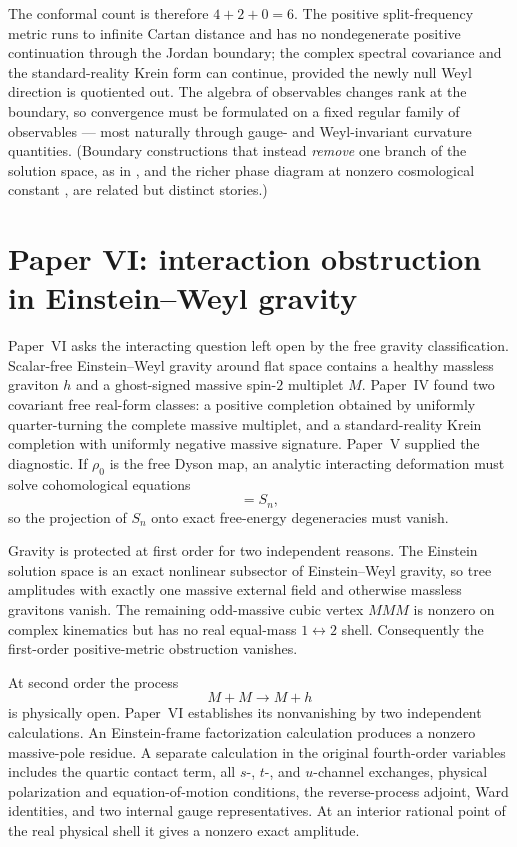 \documentclass[11pt]{article}
\theoremstyle{remark}
\begin{document}
The conformal count is therefore $4+2+0=6$.  The positive
split-frequency metric runs to infinite Cartan distance and has no
nondegenerate positive continuation through the Jordan boundary; the
complex spectral covariance and the standard-reality Krein form can
continue, provided the newly null Weyl direction is quotiented out.  The
algebra of observables changes rank at the boundary, so convergence must
be formulated on a fixed regular family of observables --- most naturally
through gauge- and Weyl-invariant curvature quantities.  (Boundary
constructions that instead \emph{remove} one branch of the solution
space, as in \cite{Maldacena}, and the richer phase diagram at nonzero
cosmological constant \cite{LuPope,DeserWaldron}, are related but
distinct stories.)

\section{Paper VI: interaction obstruction in Einstein--Weyl gravity}
\label{sec:gravityinteractions}

Paper~VI \cite{paperVI} asks the interacting question left open by the
free gravity classification.  Scalar-free Einstein--Weyl gravity around
flat space contains a healthy massless graviton $h$ and a ghost-signed
massive spin-$2$ multiplet $M$.  Paper~IV found two covariant free
real-form classes: a positive completion obtained by uniformly
quarter-turning the complete massive multiplet, and a standard-reality
Krein completion with uniformly negative massive signature.  Paper~V
supplied the diagnostic.  If $\rho_0$ is the free Dyson map, an analytic
interacting deformation must solve cohomological equations
\begin{equation}
[h_0,R_n]=S_n,
\end{equation}
so the projection of $S_n$ onto exact free-energy degeneracies must
vanish.

Gravity is protected at first order for two independent reasons.  The
Einstein solution space is an exact nonlinear subsector of
Einstein--Weyl gravity, so tree amplitudes with exactly one massive
external field and otherwise massless gravitons vanish.  The remaining
odd-massive cubic vertex $MMM$ is nonzero on complex kinematics but has
no real equal-mass $1\leftrightarrow2$ shell.  Consequently the
first-order positive-metric obstruction vanishes.

At second order the process
\begin{equation}
M+M\longrightarrow M+h
\end{equation}
is physically open.  Paper~VI establishes its nonvanishing by two
independent calculations.  An Einstein-frame factorization calculation
produces a nonzero massive-pole residue.  A separate calculation in the
original fourth-order variables includes the quartic contact term, all
$s$-, $t$-, and $u$-channel exchanges, physical polarization and
equation-of-motion conditions, the reverse-process adjoint, Ward
identities, and two internal gauge representatives.  At an interior
rational point of the real physical shell it gives a nonzero exact
amplitude.
\end{document}
